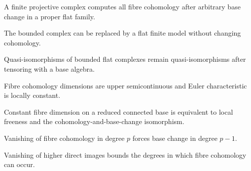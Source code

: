 \begin{remark}
\label{ch02-sec05-finite-projective-complex}
A finite projective complex computes all fibre cohomology after arbitrary base
change in a proper flat family.
\notready
\end{remark}

\begin{remark}
\label{ch02-sec05-complex-model}
The bounded complex can be replaced by a flat finite model without changing
cohomology.
\notready
\end{remark}

\begin{remark}
\label{ch02-sec05-complex-base-change}
Quasi-isomorphisms of bounded flat complexes remain quasi-isomorphisms after
tensoring with a base algebra.
\notready
\end{remark}

\begin{remark}
\label{ch02-sec05-semicontinuity}
Fibre cohomology dimensions are upper semicontinuous and Euler characteristic is
locally constant.
\notready
\end{remark}

\begin{remark}
\label{ch02-sec05-base-change-criterion}
Constant fibre dimension on a reduced connected base is equivalent to local
freeness and the cohomology-and-base-change isomorphism.
\notready
\end{remark}

\begin{remark}
\label{ch02-sec05-vanishing-previous-degree}
Vanishing of fibre cohomology in degree $p$ forces base change in degree $p-1$.
\notready
\end{remark}

\begin{remark}
\label{ch02-sec05-higher-vanishing}
Vanishing of higher direct images bounds the degrees in which fibre cohomology
can occur.
\notready
\end{remark}

